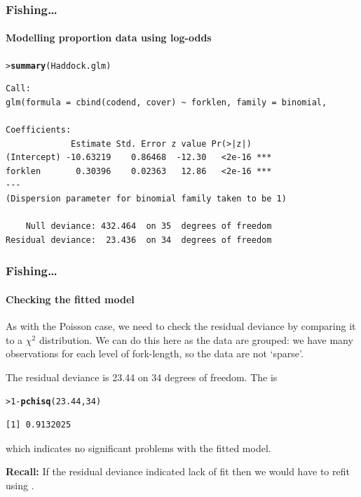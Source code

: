 \documentclass{beamer}\usepackage[]{graphicx}\usepackage[]{xcolor}
\makeatletter
\newcommand{\hlnum}[1]{\textcolor[rgb]{0.686,0.059,0.569}{#1}}%
\newcommand{\hlopt}[1]{\textcolor[rgb]{0,0,0}{#1}}%
\newcommand{\hlstd}[1]{\textcolor[rgb]{0.345,0.345,0.345}{#1}}%
\newcommand{\hlkwd}[1]{\textcolor[rgb]{0.737,0.353,0.396}{\textbf{#1}}}%
\newenvironment{kframe}{%
 \def\at@end@of@kframe{}%
 \ifinner\ifhmode%
  \def\at@end@of@kframe{\end{minipage}}%
  \begin{minipage}{\columnwidth}%
 \fi\fi%
 \def\FrameCommand##1{\hskip\@totalleftmargin \hskip-\fboxsep
 \colorbox{shadecolor}{##1}\hskip-\fboxsep
     \hskip-\linewidth \hskip-\@totalleftmargin \hskip\columnwidth}%
 \MakeFramed {\advance\hsize-\width
   \@totalleftmargin\z@ \linewidth\hsize
   \@setminipage}}%
 {\par\unskip\endMakeFramed%
 \at@end@of@kframe}
\newenvironment{knitrout}{}{} %
\makeatother
\begin{document}
\begin{frame}[fragile]
\frametitle{Fishing\ldots}
\framesubtitle{Modelling proportion data using log-odds}
\begin{knitrout}\scriptsize
{}\color{fgcolor}\begin{kframe}
\begin{alltt}
\hlstd{> }\hlkwd{summary}\hlstd{(Haddock.glm)}
\end{alltt}
\end{kframe}
\end{knitrout}

\begin{knitrout}\scriptsize
{}\color{fgcolor}\begin{kframe}
\begin{verbatim}
Call:
glm(formula = cbind(codend, cover) ~ forklen, family = binomial, 

Coefficients:
             Estimate Std. Error z value Pr(>|z|)    
(Intercept) -10.63219    0.86468  -12.30   <2e-16 ***
forklen       0.30396    0.02363   12.86   <2e-16 ***
---
(Dispersion parameter for binomial family taken to be 1)

    Null deviance: 432.464  on 35  degrees of freedom
Residual deviance:  23.436  on 34  degrees of freedom
\end{verbatim}
\end{kframe}
\end{knitrout}
\end{frame}


\begin{frame}[fragile]
\frametitle{Fishing\ldots}
\framesubtitle{Checking the fitted model}

As with the Poisson case, we need to check the residual deviance by comparing it to a $\chi^2$ distribution. We can do this here as the data are grouped: we have many observations for each level of fork-length, so the data are not `sparse'.

\medskip

The residual deviance is 23.44 on 34 degrees of freedom. 
The \pval{} is 

\begin{knitrout}\scriptsize
{}\color{fgcolor}\begin{kframe}
\begin{alltt}
\hlstd{> }\hlnum{1}\hlopt{-}\hlkwd{pchisq}\hlstd{(}\hlnum{23.44}\hlstd{,}\hlnum{34}\hlstd{)}
\end{alltt}
\begin{verbatim}
[1] 0.9132025
\end{verbatim}
\end{kframe}
\end{knitrout}
which indicates no significant problems with the fitted model.

\bigskip
{\bf Recall:} 
If the residual deviance indicated lack of fit then we would have to refit
using .
\end{frame}
\end{document}
